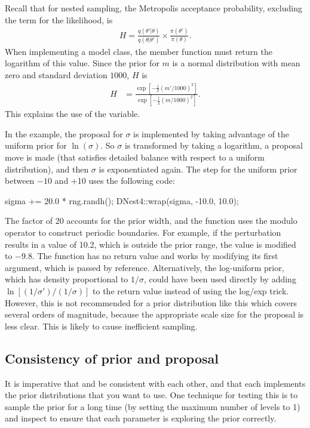 \documentclass[article]{jss}
\newcommand{\params}{\theta}
\begin{document}
Recall that for nested sampling, the Metropolis acceptance probability,
excluding the term for the likelihood, is
\begin{align*}
H = \frac{q(\params'|\params)}{q(\params | \params')}
\times \frac{\pi(\params')}{\pi(\params)}.
\end{align*}
When implementing a model class, the
member function must return the logarithm of this value.
Since the prior for $m$ is a normal distribution with
mean zero and standard deviation $1000$, $H$ is
\begin{align*}
H &= \frac{\exp\left[-\frac{1}{2}(m'/1000)^2\right]}
{\exp\left[-\frac{1}{2}(m/1000)^2\right]}.
\end{align*}
This explains the use of the  variable.

In the example, the proposal for $\sigma$ is implemented by taking advantage
of the uniform prior for $\ln(\sigma)$. So $\sigma$ is transformed by
taking a logarithm, a proposal move is made (that satisfies detailed balance
with respect to a uniform distribution), and then $\sigma$ is exponentiated
again. The step for the uniform prior between $-10$ and +10
uses the following code:
%
\begin{CodeChunk}
\begin{CodeInput}
sigma += 20.0 * rng.randh();
DNest4::wrap(sigma, -10.0, 10.0);
\end{CodeInput}
\end{CodeChunk}
%
The factor of 20 accounts for the prior width, and
the  function uses the modulo operator
to construct periodic boundaries. For example, if the perturbation results
in a value of 10.2, which is outside the prior range, the value is modified to
$-9.8$.
The  function has no return value and works by modifying its
first argument, which is passed by reference.
Alternatively, the log-uniform prior, which has density proportional
to $1/\sigma$, could have been used directly by adding
$\ln\left[(1/\sigma')/(1/\sigma)\right]$ to the
return value instead of using the log/exp trick.
However, this is not recommended for a prior distribution like this
which covers several orders of magnitude, because the appropriate scale size
for the proposal is less clear. This is likely to cause inefficient
sampling.

\subsection{Consistency of prior and proposal}
It is imperative that  and
be consistent with each other, and that each implements
the prior distributions that you want to use. One technique
for testing this is to sample the prior for a long time
(by setting the maximum number of levels to 1) and inspect
 to ensure that each parameter is exploring
the prior correctly.
\end{document}
